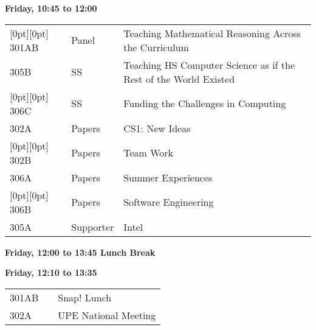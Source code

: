 
\noindent
{\sffamily\bfseries Friday, 10:45 to 12:00}\newline\noindent
\begin{tabular*}{5in}{@{}p{0.5in}@{}p{0.75in}@{}p{3.75in}}
\rowcolor[gray]{0.9}[0pt][0pt] 301AB & Panel & Teaching Mathematical Reasoning Across the Curriculum \\

305B & SS & Teaching HS Computer Science as if the Rest of the World Existed \\

\rowcolor[gray]{0.9}[0pt][0pt] 306C & SS & Funding the Challenges in Computing \\

302A & Papers & CS1:  New Ideas \\

\rowcolor[gray]{0.9}[0pt][0pt] 302B & Papers & Team Work \\

306A & Papers & Summer Experiences \\

\rowcolor[gray]{0.9}[0pt][0pt] 306B & Papers & Software Engineering \\

305A & Supporter & Intel 
\end{tabular*}
{\sffamily\bfseries Friday, 12:00 to 13:45  Lunch Break}\newline\noindent

\noindent
{\sffamily\bfseries Friday, 12:10 to 13:35}\newline\noindent
\begin{tabular*}{5in}{@{}p{0.5in}@{}p{0.75in}@{}p{3.75in}}

301AB &  & Snap! Lunch \\

302A & & UPE National Meeting \\
\end{tabular*}

